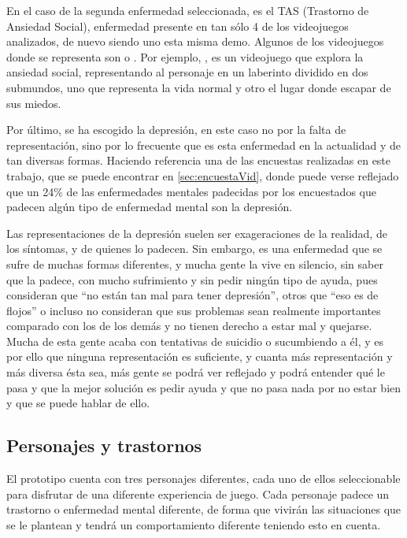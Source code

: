 \documentclass[12pt, a4paper,twoside,titlepage]{book}
\begin{document}
En el caso de la segunda enfermedad seleccionada, es el TAS (Trastorno de Ansiedad Social), enfermedad presente en tan sólo 4 de los videojuegos analizados, de nuevo siendo uno esta misma demo. Algunos de los videojuegos donde se representa son  o . Por ejemplo, , es un videojuego que explora la ansiedad social, representando al personaje en un laberinto dividido en dos submundos, uno que representa la vida normal y otro el lugar donde escapar de sus miedos. 

Por último, se ha escogido la depresión, en este caso no por la falta de representación, sino por lo frecuente que es esta enfermedad en la actualidad y de tan diversas formas. Haciendo referencia una de las encuestas realizadas en este trabajo, que se puede encontrar en \ref{sec:encuestaVid}, donde puede verse reflejado que un 24\% de las enfermedades mentales padecidas por los encuestados que padecen algún tipo de enfermedad mental son la depresión.

Las representaciones de la depresión suelen ser exageraciones de la realidad, de los síntomas, y de quienes lo padecen. Sin embargo, es una enfermedad que se sufre de muchas formas diferentes, y mucha gente la vive en silencio, sin saber que la padece, con mucho sufrimiento y sin pedir ningún tipo de ayuda, pues consideran que ``no están tan mal para tener depresión'', otros que ``eso es de flojos'' o incluso no consideran que sus problemas sean realmente importantes comparado con los de los demás y no tienen derecho a estar mal y quejarse. Mucha de esta gente acaba con tentativas de suicidio o sucumbiendo a él, y es por ello que ninguna representación es suficiente, y cuanta más representación y más diversa ésta sea, más gente se podrá ver reflejado y podrá entender qué le pasa y que la mejor solución es pedir ayuda y que no pasa nada por no estar bien y que se puede hablar de ello. 




\subsection{Personajes y trastornos}


El prototipo cuenta con tres personajes diferentes, cada uno de ellos seleccionable para disfrutar de una diferente experiencia de juego. Cada personaje padece un trastorno o enfermedad mental diferente, de forma que vivirán las situaciones que se le plantean y tendrá un comportamiento diferente teniendo esto en cuenta.  
\end{document}
